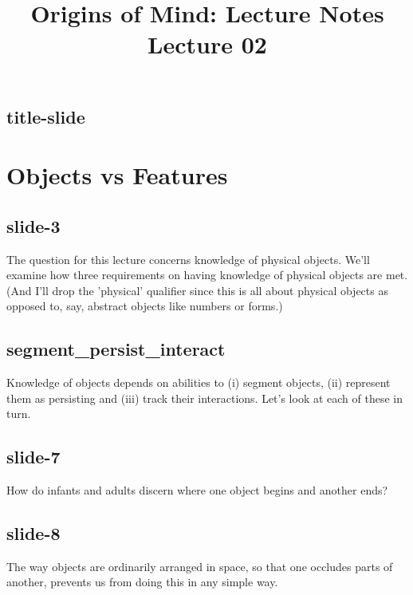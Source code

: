 \documentclass[12pt,\papersize]{extarticle}
\begin{document}
\setlength\footnotesep{1em}






\title {Origins of Mind: Lecture Notes \\ Lecture 02}
 
\maketitle
 
 
\subsection{title-slide}
 
\section{Objects vs Features}
 
 
\subsection{slide-3}
The question for this lecture concerns knowledge of physical objects.
We'll examine how three requirements on having knowledge of physical objects are met.
(And I'll drop the 'physical' qualifier since this is all about physical objects as opposed to, say, abstract objects like numbers or forms.)
 
 
\subsection{segment\_persist\_interact}
Knowledge of objects depends on abilities to (i) segment objects, (ii) represent them as persisting and (iii) track their interactions.
Let's look at each of these in turn.
 
 
\subsection{slide-7}
How do infants and adults discern where one object begins and another ends?
 
 
\subsection{slide-8}
The way objects are ordinarily arranged in space, so that one occludes parts of another, prevents us from doing this in any simple way.
 
\end{document}
